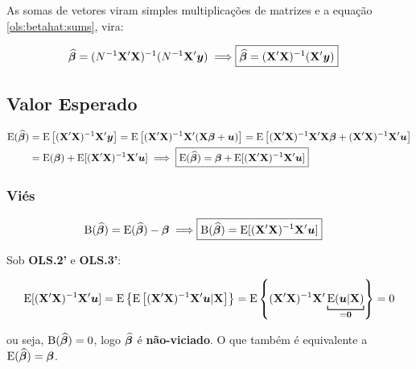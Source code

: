 \documentclass[11pt, oneside, a4paper, article]{article}
\numberwithin{equation}{section}
\begin{document}
As somas de vetores viram simples multiplicações de matrizes e a equação \eqref{ols:betahat:sums}, vira:

\vspace{-1 em}
\begin{align} 
\label{ols:betahat:mat}
\widehat{\betavec} = (N^{-1} \Xmat' \Xmat)^{-1} (N^{-1} \Xmat'\yvec)
\implies
\Aboxed{ \widehat{\betavec} = (\Xmat'\Xmat)^{-1}(\Xmat'\yvec)}
\end{align}

\subsection{Valor Esperado} 

\vspace{-2 em}
\begin{align*} 
\text{E} ( \widehat{\boldsymbol{\beta}} ) 
&= \text{E} \left[ (\mathbf{X}'\mathbf{X})^{-1}\mathbf{X}'\boldsymbol{y} \right]
= \text{E} \left[ (\mathbf{X}'\mathbf{X})^{-1}\mathbf{X}'(\mathbf{X} \boldsymbol{\beta} + \boldsymbol{u}) \right]
= \text{E} \left[ (\mathbf{X}'\mathbf{X})^{-1}\mathbf{X}'\mathbf{X} \boldsymbol{\beta} + (\mathbf{X}'\mathbf{X})^{-1}\mathbf{X}'\boldsymbol{u} \right]
\\
&= \text{E} (\boldsymbol{\beta}) + \text{E}[(\mathbf{X}'\mathbf{X})^{-1}\mathbf{X}'\boldsymbol{u} ]
\implies
\boxed{
\text{E} ( \widehat{\boldsymbol{\beta}} ) 
= \boldsymbol{\beta} + \text{E}[(\mathbf{X}'\mathbf{X})^{-1}\mathbf{X}'\boldsymbol{u} ] }
\end{align*}

\subsubsection{Viés} 

\vspace{-2 em}
\begin{align*} 
\B( \widehat{\betavec} ) = \E ( \widehat{\betavec} ) - \betavec
\implies
\Aboxed{ \B( \widehat{\betavec} ) = \E[ (\Xmat'\Xmat)^{-1}\Xmat'\uvec ] }
\end{align*}

\begin{remark}
Sob \textbf{OLS.2'} e \textbf{OLS.3'}:

\vspace{-2 em}
\begin{align*}
\E[(\Xmat'\Xmat)^{-1}\Xmat'\uvec ]
= \E \left\{ \E\left[ (\Xmat'\Xmat)^{-1}\Xmat'\uvec | \Xmat \right]  \right\}  
= \E \left\{  (\Xmat'\Xmat)^{-1}\Xmat'
\underbracket[.75pt]{\E( \uvec | \Xmat )}_{= \zerovec}
\right\} = 0
\end{align*}

\noindent
ou seja, 
$\text{B}( \widehat{\boldsymbol{\beta}} ) = 0$, logo $\widehat{\boldsymbol{\beta}}$ é \textbf{não-viciado}.
O que também é equivalente a  $\text{E}( \widehat{\boldsymbol{\beta}} ) = \boldsymbol{\beta}$.
\end{remark}
\end{document}
